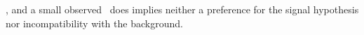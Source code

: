 , and a small observed \pvalue\ does implies neither
a preference for the signal hypothesis nor incompatibility with the background.


